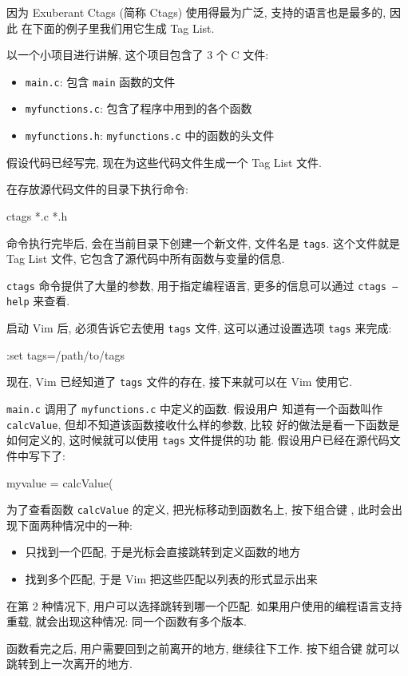 因为 Exuberant Ctags (简称 Ctags) 使用得最为广泛, 支持的语言也是最多的, 因此
在下面的例子里我们用它生成 Tag List.

以一个小项目进行讲解, 这个项目包含了 3 个 C 文件:
\begin{itemize}
    \item \texttt{main.c}: 包含 \texttt{main} 函数的文件
    \item \texttt{myfunctions.c}: 包含了程序中用到的各个函数
    \item \texttt{myfunctions.h}: \texttt{myfunctions.c} 中的函数的头文件
\end{itemize}
假设代码已经写完, 现在为这些代码文件生成一个 Tag List 文件.

在存放源代码文件的目录下执行命令:
\begin{vimcode}
ctags *.c *.h
\end{vimcode}
命令执行完毕后, 会在当前目录下创建一个新文件, 文件名是 \texttt{tags}.
这个文件就是 Tag List 文件, 它包含了源代码中所有函数与变量的信息.
\begin{warning}
    \texttt{ctags} 命令提供了大量的参数, 用于指定编程语言, 更多的信息可以通过
    \texttt{ctags --help} 来查看.
\end{warning}
启动 Vim 后, 必须告诉它去使用 \texttt{tags} 文件, 这可以通过设置选项
\texttt{tags} 来完成:
\begin{vimcode}
:set tags=/path/to/tags
\end{vimcode}
现在, Vim 已经知道了 \texttt{tags} 文件的存在, 接下来就可以在 Vim 使用它.

\texttt{main.c} 调用了 \texttt{myfunctions.c} 中定义的函数. 假设用户
知道有一个函数叫作 \texttt{calcValue}, 但却不知道该函数接收什么样的参数, 比较
好的做法是看一下函数是如何定义的, 这时候就可以使用 \texttt{tags} 文件提供的功
能. 假设用户已经在源代码文件中写下了:
\begin{vimcode}
myvalue = calcValue(
\end{vimcode}
为了查看函数 \texttt{calcValue} 的定义, 把光标移动到函数名上, 按下组合键
\key{Ctrl+]}, 此时会出现下面两种情况中的一种:
\begin{itemize}
    \item 只找到一个匹配, 于是光标会直接跳转到定义函数的地方
    \item 找到多个匹配, 于是 Vim 把这些匹配以列表的形式显示出来
\end{itemize}
在第 2 种情况下, 用户可以选择跳转到哪一个匹配. 如果用户使用的编程语言支持重载,
就会出现这种情况: 同一个函数有多个版本.

函数看完之后, 用户需要回到之前离开的地方, 继续往下工作. 按下组合键
 就可以跳转到上一次离开的地方.

